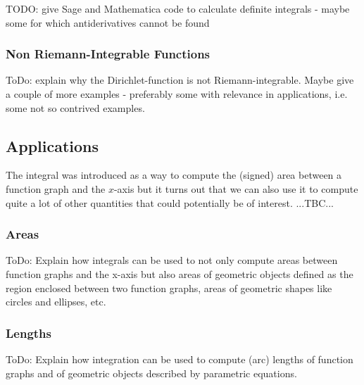 TODO: give Sage and Mathematica code to calculate definite integrals - maybe some for which antiderivatives cannot be found


\subsubsection{Non Riemann-Integrable Functions} ToDo: explain why the Dirichlet-function is not Riemann-integrable. Maybe give a couple of more examples - preferably some with relevance in applications, i.e. some not so contrived examples.



\subsection{Applications} 
The integral was introduced as a way to compute the (signed) area between a function graph and the $x$-axis but it turns out that we can also use it to compute quite a lot of other quantities that could potentially be of interest. ...TBC...

\subsubsection{Areas}
ToDo: Explain how integrals can be used to not only compute areas between function graphs and the x-axis but also areas of geometric objects defined as the region enclosed between two function graphs, areas of geometric shapes like circles and ellipses, etc.


\subsubsection{Lengths}
ToDo: Explain how integration can be used to compute (arc) lengths of function graphs and of geometric objects described by parametric equations.

